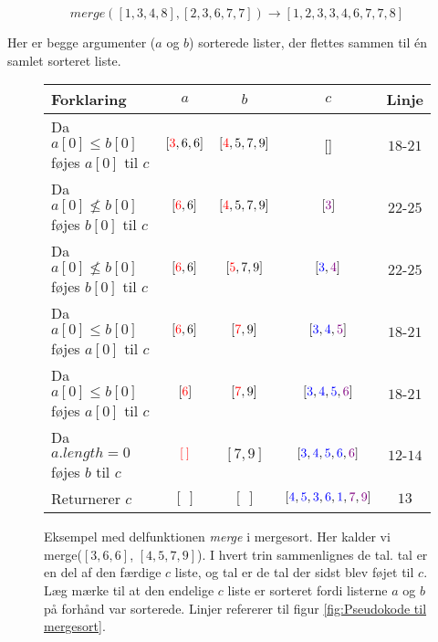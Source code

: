 $$merge([1,3,4,8],[2,3,6,7,7]) \longrightarrow [1, 2, 3, 3, 4, 6, 7, 7, 8]$$

Her er begge argumenter ($a$ og $b$) sorterede lister, der flettes sammen til én samlet sorteret liste.\\



\begin{figure}
	\begin{center}
		\padtable
		\begin{tabular}{l|c|c|c|c}
			Forklaring & $a$ & $b$ & $c$ & Linje\\
			\hline
			 Da $a[0] \leq b[0]$ føjes $a[0]$ til $c$ & $[\color{red}3\color{black},6,6]$ & $[\color{red}4\color{black},5,7,9]$ & [\:] & $18$-$21$\\
			 Da $a[0] \nleq b[0]$ føjes $b[0]$ til $c$ & $[\color{red}6\color{black},6]$ & $[\color{red}4\color{black},5,7,9]$ & $[\color{violet}3\color{black}]$ & $22$-$25$\\
			 Da $a[0] \nleq b[0]$ føjes $b[0]$ til $c$ & $[\color{red}6\color{black},6]$ & $[\color{red}5\color{black},7,9]$ & $[\color{blue}3\color{black},\color{violet}4\color{black}]$ & $22$-$25$\\
			 Da $a[0] \leq b[0]$ føjes $a[0]$ til $c$ & $[\color{red}6\color{black},6]$ & $[\color{red}7\color{black},9]$ & $[\color{blue}3\color{black},\color{blue}4\color{black},\color{violet}5\color{black}]$ & $18$-$21$\\
			 Da $a[0] \leq b[0]$ føjes $a[0]$ til $c$ & $[\color{red}6\color{black}]$ & $[\color{red}7\color{black},9]$ & $[\color{blue}3\color{black},\color{blue}4\color{black},\color{blue}5\color{black},\color{violet}6\color{black}]$ & $18$-$21$\\
			 Da $a.length = 0$ føjes $b$ til $c$ & $\color{red}[\:]\color{black}$ & $[7,9]$ & $[\color{blue}3\color{black},\color{blue}4\color{black},\color{blue}5\color{black},\color{blue}6\color{black},\color{violet}6\color{black}]$ & $12$-$14$\\
			 Returnerer $c$ & $[\:]$ & $[\:]$ & $[\color{blue}4\color{black},\color{blue}5\color{black},\color{blue}3\color{black},\color{blue}6\color{black},\color{blue}1\color{black},\color{violet}7\color{black},\color{violet}9\color{black}]$ & $13$\\
		\end{tabular}
	\end{center}
	\caption{Eksempel med delfunktionen \emph{merge} i mergesort. Her kalder vi merge($[3,6,6]$, $[4,5,7,9]$). I hvert trin sammenlignes de  tal. tal er en del af den færdige $c$ liste, og  tal er de tal der sidst blev føjet til $c$. Læg mærke til at den endelige $c$ liste er sorteret fordi listerne $a$ og $b$ på forhånd var sorterede. Linjer refererer til figur \ref{fig:Pseudokode til mergesort}.}
	\label{fig:merge i mergesort}
\end{figure}



